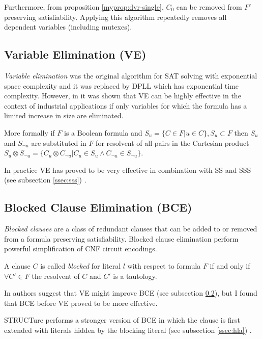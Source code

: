 Furthermore, from proposition \ref{myprop:dvr-single}, $C_0$ can be
removed from $F'$ preserving satisfiability. Applying this algorithm
repeatedly removes all dependent variables (including mutexes).



\subsection{Variable Elimination (VE)}
\label{ssec:ve}

\emph{Variable elimination} \cite{Davis:1960:CPQ:321033.321034}
was the original algorithm for SAT solving with
exponential space complexity and it was replaced by
DPLL which has exponential time complexity.  However, in
\cite{Subbarayan04niver:non,Een05effectivepreprocessing} it was
shown that VE can be highly effective in the context of industrial
applications if only variables for which the formula has
a limited increase in size are eliminated.


More formally if $F$ is a Boolean formula and $S_u = \{ C \in F | u
\in C \},S_u \subset F$ then $S_u$ and $S_{\neg u}$ are substituted
in $F$ for resolvent of all pairs in the Cartesian product $S_u
\otimes S_{\neg u} = \{ C_u \otimes C_{\neg u} | C_u \in S_u \land
C_{\neg u} \in S_{\neg u}\}$.

In practice VE has proved to be very effective in
combination with SS and SSS (see subsection \ref{ssec:sss})
\cite{Een05effectivepreprocessing}.


\subsection{Blocked Clause Elimination (BCE)}
\label{ssec:bce}

\emph{Blocked clauses} are a class of redundant clauses
that can be added to \cite{Kullmann:1999:NMD:312269.312271} or
removed from \cite{Jarvisalo_blockedclause} a formula preserving
satisfiability. Blocked clause elimination perform powerful
simplification of CNF circuit encodings.

\begin{mydef}
  A clause $C$ is called \emph{blocked}
  for literal $l$ with respect to formula $F$ if and only if $\forall
  C' \in F$ the resolvent of $C$ and $C'$ is a tautology.
\end{mydef}


In \cite{Jarvisalo_blockedclause}
authors suggest that VE might improve BCE (see subsection
\ref{ssec:bce}), but I found that BCE before VE proved to be more
effective.


STRUCTure performs a stronger version of BCE in which the clause
is first extended with literals hidden by the blocking literal
(see subsection \ref{ssec:hla}) \cite{Heule_coveredclause}.
